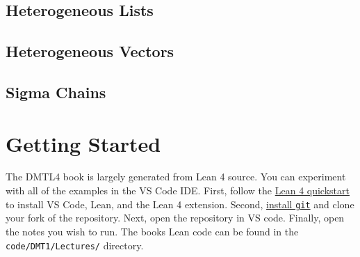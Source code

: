 \documentclass{book}
\begin{document}
\hypertarget{pandoc.profile.debug__pandoc__debug__src__dmt1__lectures__l11_typeheterogeneity__c04_heterolist.lean.md}{}
\hypertarget{pandoc.profile.debug__pandoc__debug__src__dmt1__lectures__l11_typeheterogeneity__c04_heterolist.lean.md__heterogeneous-lists}{%
\section{Heterogeneous Lists}\label{pandoc.profile.debug__pandoc__debug__src__dmt1__lectures__l11_typeheterogeneity__c04_heterolist.lean.md__heterogeneous-lists}}

\hypertarget{pandoc.profile.debug__pandoc__debug__src__dmt1__lectures__l11_typeheterogeneity__c05_heterovector.lean.md}{}
\hypertarget{pandoc.profile.debug__pandoc__debug__src__dmt1__lectures__l11_typeheterogeneity__c05_heterovector.lean.md__heterogeneous-vectors}{%
\section{Heterogeneous Vectors}\label{pandoc.profile.debug__pandoc__debug__src__dmt1__lectures__l11_typeheterogeneity__c05_heterovector.lean.md__heterogeneous-vectors}}

\hypertarget{pandoc.profile.debug__pandoc__debug__src__dmt1__lectures__l11_typeheterogeneity__c06_sigmachain.lean.md}{}
\hypertarget{pandoc.profile.debug__pandoc__debug__src__dmt1__lectures__l11_typeheterogeneity__c06_sigmachain.lean.md__sigma-chains}{%
\section{Sigma Chains}\label{pandoc.profile.debug__pandoc__debug__src__dmt1__lectures__l11_typeheterogeneity__c06_sigmachain.lean.md__sigma-chains}}

\hypertarget{pandoc.profile.debug__pandoc__debug__src__build.md}{}
\hypertarget{pandoc.profile.debug__pandoc__debug__src__build.md__getting-started}{%
\chapter*{Getting Started}\label{pandoc.profile.debug__pandoc__debug__src__build.md__getting-started}}

The DMTL4 book is largely generated from Lean 4 source. You can experiment with
all of the examples in the VS Code IDE. First, follow the \href{https://lean-lang.org/lean4/doc/quickstart.html}{Lean 4 quickstart} to
install VS Code, Lean, and the Lean 4 extension. Second, \href{https://github.com/git-guides/install-git}{install \texttt{git}} and
clone your fork of the repository. Next, open the repository in VS code.
Finally, open the notes you wish to run. The book\textquotesingle s Lean code can be found in the
\texttt{code/DMT1/Lectures/} directory.
\end{document}
